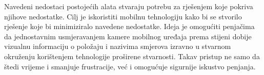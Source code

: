 Navedeni nedostaci postojećih alata stvaraju potrebu za rješenjem koje pokriva njihove nedostatke. Cilj je iskoristiti mobilnu tehnologiju kako bi se stvorilo rješenje koje bi minimiziralo navedene nedostatke. Ideja je omogućiti penjačima da jednostavnim usmjeravanjem kamere mobilnog uređaja prema stijeni dobije vizualnu informaciju o položaju i nazivima smjerova izravno u stvarnom okruženju korištenjem tehnologije proširene stvarnosti. Takav pristup ne samo da štedi vrijeme i smanjuje frustracije, već i omogućuje sigurnije iskustvo penjanja. 